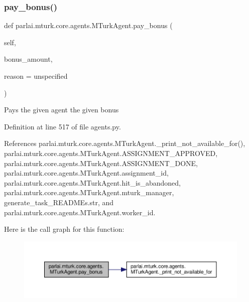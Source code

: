 \subsubsection{\texorpdfstring{pay\+\_\+bonus()}{pay\_bonus()}}
{\footnotesize\ttfamily def parlai.\+mturk.\+core.\+agents.\+M\+Turk\+Agent.\+pay\+\_\+bonus (\begin{DoxyParamCaption}\item[{}]{self,  }\item[{}]{bonus\+\_\+amount,  }\item[{}]{reason = {\ttfamily \textquotesingle{}unspecified\textquotesingle{}} }\end{DoxyParamCaption})}

\begin{DoxyVerb}Pays the given agent the given bonus\end{DoxyVerb}
 

Definition at line 517 of file agents.\+py.



References parlai.\+mturk.\+core.\+agents.\+M\+Turk\+Agent.\+\_\+print\+\_\+not\+\_\+available\+\_\+for(), parlai.\+mturk.\+core.\+agents.\+M\+Turk\+Agent.\+A\+S\+S\+I\+G\+N\+M\+E\+N\+T\+\_\+\+A\+P\+P\+R\+O\+V\+ED, parlai.\+mturk.\+core.\+agents.\+M\+Turk\+Agent.\+A\+S\+S\+I\+G\+N\+M\+E\+N\+T\+\_\+\+D\+O\+NE, parlai.\+mturk.\+core.\+agents.\+M\+Turk\+Agent.\+assignment\+\_\+id, parlai.\+mturk.\+core.\+agents.\+M\+Turk\+Agent.\+hit\+\_\+is\+\_\+abandoned, parlai.\+mturk.\+core.\+agents.\+M\+Turk\+Agent.\+mturk\+\_\+manager, generate\+\_\+task\+\_\+\+R\+E\+A\+D\+M\+Es.\+str, and parlai.\+mturk.\+core.\+agents.\+M\+Turk\+Agent.\+worker\+\_\+id.

Here is the call graph for this function\+:
\nopagebreak
\begin{figure}[H]
\begin{center}
\leavevmode
\includegraphics[width=350pt]{classparlai_1_1mturk_1_1core_1_1agents_1_1MTurkAgent_afdcfa4b074f379039112935c65463a40_cgraph}
\end{center}
\end{figure}
\mbox{\label{classparlai_1_1mturk_1_1core_1_1agents_1_1MTurkAgent_a547ab71740a8dccd4a94150109876c9c}} 
